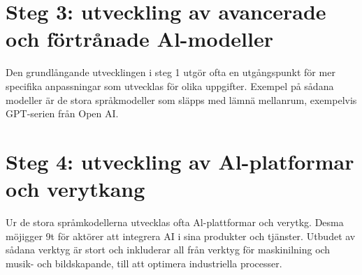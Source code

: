 {{{{{{{{{{{{{\section*{Steg 3: utveckling av avancerade och förtrånade Al-modeller}
Den grundlångande utvecklingen i steg 1 utgör ofta en utgångspunkt för mer specifika anpassningar som utvecklas för olika uppgifter. Exempel på sådana modeller är de stora språkmodeller som släpps med lämnä mellanrum, exempelvis GPT-serien från Open AI.
\section*{Steg 4: utveckling av Al-platformar och verytkang}
Ur de stora språmkodellerna utvecklas ofta Al-plattformar och verytkg. Desma möjigger 9t för aktörer att integrera AI i sina produkter och tjänster. Utbudet av sådana verktyg är stort och inkluderar all från verktyg för maskinilning och musik- och bildskapande, till att optimera industriella processer.

}}}}}}}}}}}}}
